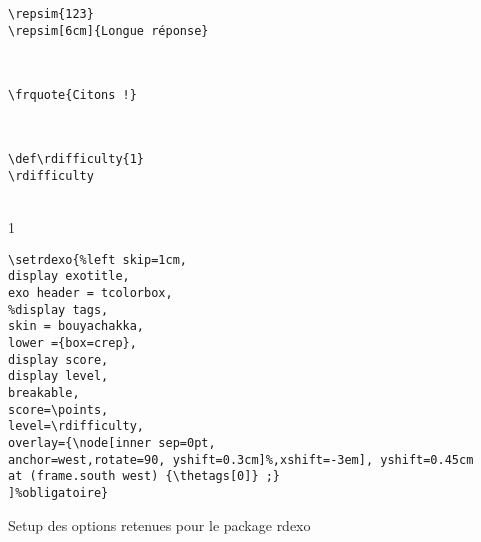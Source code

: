 \begin{tcolorbox}[colback=yellow!10!white, title=Exemple d'utilisation pour \texttt{repsim}]
\begin{minipage}{0.45\textwidth}
\begin{lstlisting}[breaklines]
\repsim{123}
\repsim[6cm]{Longue réponse}
\end{lstlisting}
\end{minipage}
\hfill
\begin{minipage}{0.45\textwidth}
\phantom{a}\\
\end{minipage}
\end{tcolorbox}


\begin{tcolorbox}[colback=yellow!10!white, title=Exemple d'utilisation pour \texttt{frquote}]
\begin{minipage}{0.45\textwidth}
\begin{lstlisting}[breaklines]
\frquote{Citons !}
\end{lstlisting}
\end{minipage}
\hfill
\begin{minipage}{0.45\textwidth}
\phantom{a}\\
\end{minipage}
\end{tcolorbox}


\begin{tcolorbox}[colback=yellow!10!white, title=Exemple d'utilisation pour \texttt{rdifficulty}]
\begin{minipage}{0.45\textwidth}
\begin{lstlisting}[breaklines]
\def\rdifficulty{1}
\rdifficulty
\end{lstlisting}
\end{minipage}
\hfill
\begin{minipage}{0.45\textwidth}
\phantom{a}\\
\def\rdifficulty{1}%
\rdifficulty
\end{minipage}
\end{tcolorbox}


\begin{tcolorbox}[colback=yellow!10!white, title=Exemple d'utilisation pour \texttt{setrdexo}]
\begin{minipage}{0.45\textwidth}
\begin{lstlisting}[breaklines]
\setrdexo{%left skip=1cm,
display exotitle,
exo header = tcolorbox,
%display tags,
skin = bouyachakka,
lower ={box=crep},
display score,
display level,
breakable,
score=\points,
level=\rdifficulty,
overlay={\node[inner sep=0pt,
anchor=west,rotate=90, yshift=0.3cm]%,xshift=-3em], yshift=0.45cm
at (frame.south west) {\thetags[0]} ;}
]%obligatoire}
\end{lstlisting}
\end{minipage}
\hfill
\begin{minipage}{0.45\textwidth}
Setup des options retenues pour le package rdexo
\end{minipage}
\end{tcolorbox}


